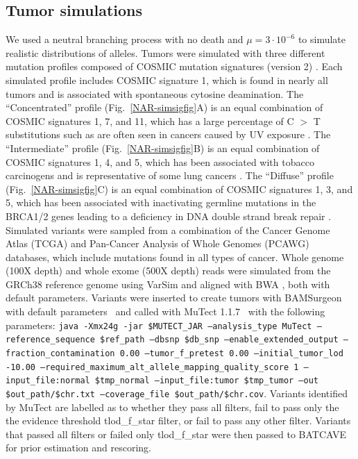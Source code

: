 \documentclass[a4,center,fleqn]{NAR}
\newcommand{\batcave}{BATCAVE\xspace}
\begin{document}
\subsection{Tumor simulations}
We used a neutral branching process with no death and $\mu=3\cdot10^{-6}$ to simulate realistic distributions of alleles.
Tumors were simulated with three different mutation profiles composed of COSMIC mutation signatures (version 2) \cite{Cosmic_consortium}.
Each simulated profile includes COSMIC signature 1, which is found in nearly all tumors and is associated with spontaneous cytosine deamination.
The ``Concentrated'' profile (Fig.~\ref{NAR-simsigfig}A) is an equal combination of COSMIC signatures 1, 7, and 11, which has a large percentage of C $>$ T substitutions such as are often seen in cancers caused by UV exposure \cite{Alexandrov2013}.
The ``Intermediate'' profile (Fig.~\ref{NAR-simsigfig}B) is an equal combination of COSMIC signatures 1, 4, and 5, which has been associated with tobacco carcinogens and is representative of some lung cancers \cite{Alexandrov2013}.
The ``Diffuse'' profile (Fig.~\ref{NAR-simsigfig}C) is an equal combination of COSMIC signatures 1, 3, and 5, which has been associated with inactivating germline mutations in the BRCA1/2 genes leading to a deficiency in DNA double strand break repair \cite{Nik-Zainal2016}.
Simulated variants were sampled from a combination of the Cancer Genome Atlas (TCGA) and Pan-Cancer Analysis of Whole Genomes (PCAWG) databases, which include mutations found in all types of cancer.
Whole genome (100X depth) and whole exome (500X depth) reads were simulated from the GRCh38 reference genome using VarSim \cite{Mu2015} and aligned with BWA \cite{Li2009a}, both with default parameters.
Variants were inserted to create tumors with BAMSurgeon with default parameters~\citep{Ewing2015a} and called with MuTect 1.1.7~\cite{Cibulskis2013} with the following parameters:
\texttt{\small java -Xmx24g -jar \$MUTECT\_JAR --analysis\_type MuTect 
        --reference\_sequence \$ref\_path 
        --dbsnp \$db\_snp 
        --enable\_extended\_output 
        --fraction\_contamination 0.00 
        --tumor\_f\_pretest 0.00 
        --initial\_tumor\_lod -10.00 
        --required\_maximum\_alt\_allele\_mapping\_quality\_score 1 
        --input\_file:normal \$tmp\_normal 
        --input\_file:tumor \$tmp\_tumor 
        --out \$out\_path/\$chr.txt 
        --coverage\_file \$out\_path/\$chr.cov}.
Variants identified by MuTect are labelled as to whether they pass all filters, fail to pass only the the evidence threshold \textrm{tlod\_f\_star} filter, or fail to pass any other filter. 
Variants that passed all filters or failed only \textrm{tlod\_f\_star} were then passed to \batcave for prior estimation and rescoring.
\end{document}
